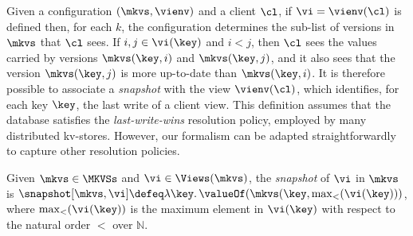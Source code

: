 Given a configuration $(\mkvs, \vienv)$ and a client $\cl$, 
if $\vi = \vienv(\cl)$ is defined then, for each $k$,  the
configuration determines the sub-list of versions in $\mkvs$ that $\cl$ sees.
If $i,j \in \vi(\key)$ and $i < j$, then $\cl$ sees the values 
carried by versions $\mkvs(\key, i)$ and  $\mkvs(\key, j)$, 
and it also sees that the version 
$\mkvs(\key, j)$ is more 
up-to-date than $\mkvs(\key, i)$. 
It is therefore possible to associate a \emph{snapshot}
with 
the view $\vienv(\cl)$, 
which identifies, for each key $\key$, the last write of a client view. 
This definition assumes that the database satisfies the \emph{last-write-wins}
resolution policy, employed by many distributed kv-stores.
However, our formalism can be adapted straightforwardly  to capture other resolution policies. 

\begin{definition}[Snapshots]
\label{def:snapshot}
Given $\mkvs \in \MKVSs$ and $\vi \in \Views(\mkvs)$, the \emph{snapshot} of $\vi$ in 
$\mkvs$ is $\snapshot[\mkvs, \vi] \defeq \lambda \key \ldotp \valueOf(\mkvs(\key, \max_{<}(\vi(\key)))$, 
where $\max_{<}(\vi(\key))$ is the maximum element in $\vi(\key)$ with respect to the natural 
order $<$ over $\mathbb{N}$.
\end{definition}






